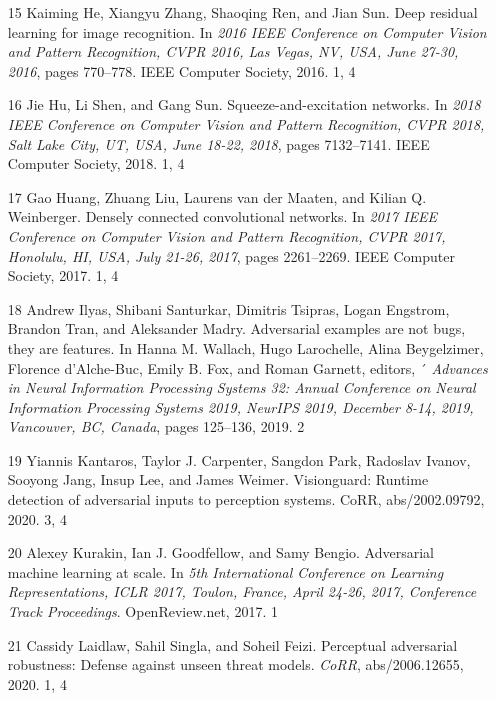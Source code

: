\documentclass{article}
\begin{document}
\begin{itemize}
\item 
[15] Kaiming He, Xiangyu Zhang, Shaoqing Ren, and Jian Sun. Deep residual learning for image recognition. In \textit{2016 IEEE Conference on Computer Vision and Pattern Recognition, CVPR 2016, Las Vegas, NV, USA, June 27-30, 2016}, pages 770–778. IEEE Computer Society, 2016. 1, 4

\item 
[16] Jie Hu, Li Shen, and Gang Sun. Squeeze-and-excitation networks. In \textit{2018 IEEE Conference on Computer Vision and Pattern Recognition, CVPR 2018, Salt Lake City, UT, USA, June 18-22, 2018}, pages 7132–7141. IEEE Computer Society, 2018. 1, 4

\item 
[17] Gao Huang, Zhuang Liu, Laurens van der Maaten, and Kilian Q. Weinberger. Densely connected convolutional networks. In \textit{2017 IEEE Conference on Computer Vision and Pattern Recognition, CVPR 2017, Honolulu, HI, USA, July 21-26, 2017}, pages 2261–2269. IEEE Computer Society, 2017. 1, 4

\item 
[18] Andrew Ilyas, Shibani Santurkar, Dimitris Tsipras, Logan Engstrom, Brandon Tran, and Aleksander Madry. Adversarial examples are not bugs, they are features. In Hanna M. Wallach, Hugo Larochelle, Alina Beygelzimer, Florence d'Alche-Buc, Emily B. Fox, and Roman Garnett, editors, ´ \textit{Advances in Neural Information Processing Systems 32: Annual Conference on Neural Information Processing Systems 2019, NeurIPS 2019, December 8-14, 2019, Vancouver, BC, Canada}, pages 125–136, 2019. 2

\item 
[19] Yiannis Kantaros, Taylor J. Carpenter, Sangdon Park, Radoslav Ivanov, Sooyong Jang, Insup Lee, and James Weimer. Visionguard: Runtime detection of adversarial inputs to perception systems. CoRR, abs/2002.09792, 2020. 3, 4

\item 
[20] Alexey Kurakin, Ian J. Goodfellow, and Samy Bengio. Adversarial machine learning at scale. In \textit{5th International Conference on Learning Representations, ICLR 2017, Toulon, France, April 24-26, 2017, Conference Track Proceedings}. OpenReview.net, 2017. 1

\item 
[21] Cassidy Laidlaw, Sahil Singla, and Soheil Feizi. Perceptual adversarial robustness: Defense against unseen threat models. \textit{CoRR}, abs/2006.12655, 2020. 1, 4


\end{itemize}
\end{document}
